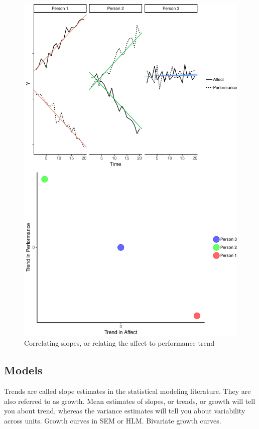 \documentclass[english,,man]{apa6}
\theoremstyle{definition}
\theoremstyle{definition}
\theoremstyle{definition}
\theoremstyle{remark}
\begin{document}
\begin{figure}
\centering
\includegraphics{figures/unnamed-chunk-14-1.pdf}
\caption{\label{fig:unnamed-chunk-14}Correlating slopes, or relating the
affect to performance trend\label{trend_correlation}}
\end{figure}

\hypertarget{models-1}{%
\subsection{Models}\label{models-1}}

Trends are called slope estimates in the statistical modeling
literature. They are also referred to as growth. Mean estimates of
slopes, or trends, or growth will tell you about trend, whereas the
variance estimates will tell you about variability across units. Growth
curves in SEM or HLM. Bivariate growth curves.
\end{document}
